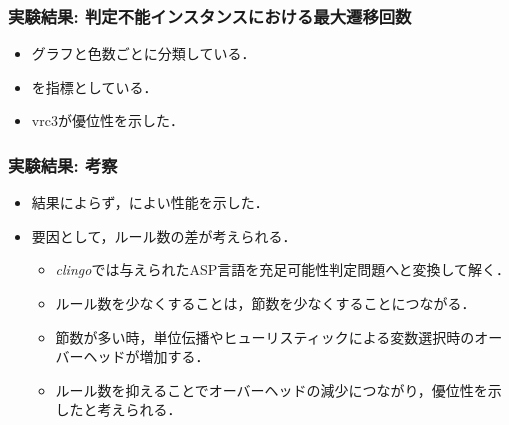 \begin{frame}\frametitle{実験結果: 判定不能インスタンスにおける最大遷移回数}
  
  \begin{table}[t]
    \centering
    
  \end{table}

  \begin{itemize}
    \item グラフと色数ごとに分類している．
    \item {}を指標としている．
    \item vrc3が優位性を示した．
  \end{itemize}

\end{frame}


\begin{frame}\frametitle{実験結果: 考察}

  \begin{itemize}
    \item 結果によらず，によい性能を示した．
    \item 要因として，\alert{ルール数の差}が考えられる．
    \begin{itemize}
      \item \textit{clingo}では与えられたASP言語を充足可能性判定問題へと変換して解く．
      \item ルール数を少なくすることは，節数を少なくすることにつながる．
      \item 節数が多い時，単位伝播やヒューリスティックによる変数選択時のオーバーヘッドが増加する．
      \item ルール数を抑えることでオーバーヘッドの減少につながり，優位性を示したと考えられる．
    \end{itemize}
  \end{itemize}
  
\end{frame}


